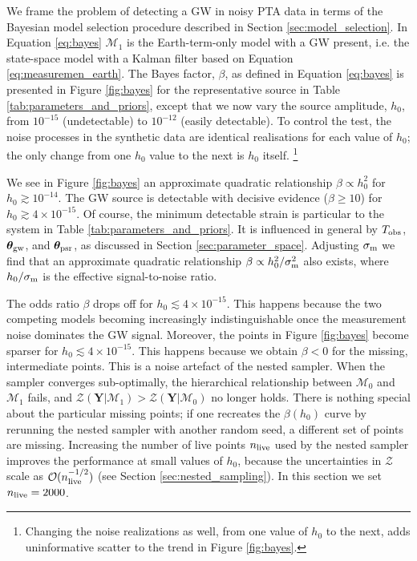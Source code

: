 \documentclass[fleqn,usenatbib,useAMS]{mnras}
\begin{document}
		
		We frame the problem of detecting a GW in noisy PTA data in terms of the Bayesian model selection procedure described in Section \ref{sec:model_selection}. In Equation \eqref{eq:bayes} $\mathcal{M}_1$ is the Earth-term-only model with a GW present, i.e. the state-space model with a Kalman filter based on Equation \eqref{eq:measuremen_earth}. The Bayes factor, $\beta$, as defined in Equation \eqref{eq:bayes} is presented in Figure \ref{fig:bayes} for the representative source in Table \ref{tab:parameters_and_priors}, except that we now vary the source amplitude, $h_0$, from $10^{-15}$ (undetectable) to $10^{-12}$ (easily detectable). To control the test, the noise processes in the synthetic data are identical realisations for each value of $h_0$; the only change from one $h_0$ value to the next is $h_0$ itself. \footnote{Changing the noise realizations as well, from one value of $h_0$ to the next, adds uninformative scatter to the trend in Figure \ref{fig:bayes}.} \newline 
		
		
		We see in Figure \ref{fig:bayes} an approximate quadratic relationship $\beta \propto h_0^2$ for $h_0 \gtrsim 10^{-14}$. The GW source is detectable with decisive evidence ($\beta \geq 10$) for $h_0 \gtrsim 4 \times 10^{-15}$. Of course, the minimum detectable strain is particular to the system in Table \ref{tab:parameters_and_priors}. It is influenced in general by $T_{\rm obs}$, ${\boldsymbol{\theta}}_{\rm gw}$, and ${\boldsymbol{\theta}}_{\rm psr}$, as discussed in Section \ref{sec:parameter_space}. Adjusting $\sigma_{\rm m}$ we find that an approximate quadratic relationship $\beta \propto h_0^2 / \sigma_{\rm m}^2$ also exists, where $h_0 / \sigma_{\rm m}$ is the effective signal-to-noise ratio. \newline 
		
		
		The odds ratio $\beta$ drops off for $h_0 \lesssim 4 \times10^{-15}$. This happens because the two competing models becoming increasingly indistinguishable once the measurement noise dominates the GW signal. Moreover, the points in Figure \ref{fig:bayes} become sparser for $h_0 \lesssim 4 \times 10^{-15}$. This happens because we obtain $\beta <0$ for the missing, intermediate points. This is a noise artefact of the nested sampler. When the sampler converges sub-optimally, the hierarchical relationship between $\mathcal{M}_0$ and  $\mathcal{M}_1$ fails, and $\mathcal{Z}(\boldsymbol{Y} | \mathcal{M}_1) > \mathcal{Z}(\boldsymbol{Y} | \mathcal{M}_0)$ no longer holds. There is nothing special about the particular missing points; if one recreates the $\beta(h_0)$ curve by rerunning the nested sampler with another random seed, a different set of points are missing. Increasing the number of live points $n_{\rm live}$ used by the nested sampler improves the performance at small values of $h_0$, because the uncertainties in $\mathcal{Z}$ scale as $\mathcal{O}(n_{\rm live}^{-1/2})$ (see Section \ref{sec:nested_sampling}). In this section we set $n_{\rm live} =2000$. 
		
\end{document}
